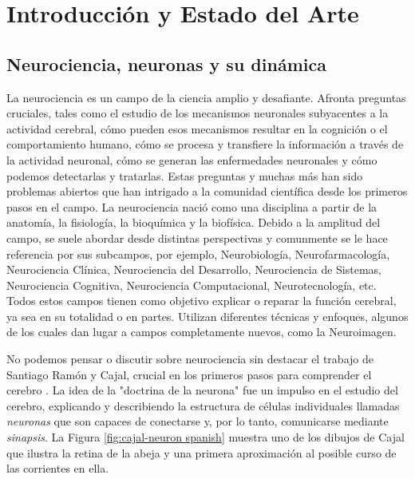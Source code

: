 \chapter{Introducción y Estado del Arte}
\label{c-intro spanish}

\section{Neurociencia, neuronas y su dinámica}
La neurociencia es un campo de la ciencia amplio y desafiante. Afronta preguntas cruciales, tales como el estudio de los mecanismos neuronales subyacentes a la actividad cerebral, cómo pueden esos mecanismos resultar en la cognición o el comportamiento humano, cómo se procesa y transfiere la información a través de la actividad neuronal, cómo se generan las enfermedades neuronales y cómo podemos detectarlas y tratarlas. 
Estas preguntas y muchas más han sido problemas abiertos que han intrigado a la comunidad científica desde los primeros pasos en el campo. La neurociencia nació como una disciplina a partir de la anatomía, la fisiología, la bioquímica y la biofísica. Debido a la amplitud del campo, se suele abordar desde distintas perspectivas y comunmente se le hace referencia por sus subcampos, por ejemplo, Neurobiología, Neurofarmacología, Neurociencia Clínica, Neurociencia del Desarrollo, Neurociencia de Sistemas, Neurociencia Cognitiva, Neurociencia Computacional, Neurotecnología, etc. Todos estos campos tienen como objetivo explicar o reparar la función cerebral, ya sea en su totalidad o en partes. Utilizan diferentes técnicas y enfoques, algunos de los cuales dan lugar a campos completamente nuevos, como la Neuroimagen.

No podemos pensar o discutir sobre neurociencia sin destacar el trabajo de Santiago Ramón y Cajal, crucial en los primeros pasos para comprender el cerebro \parencite{ramon_y_cajal_textura_1899,de_carlos_historical_2007,de_castro_editorial_2016,delgado-garcia_cajal_2015,de_castro_cajal_2019}. La idea de la "doctrina de la neurona" fue un impulso en el estudio del cerebro, explicando y describiendo la estructura de células individuales llamadas \textit{neuronas} que son capaces de conectarse y, por lo tanto, comunicarse mediante \textit{sinapsis}. La Figura \ref{fig:cajal-neuron spanish} muestra uno de los dibujos de Cajal que ilustra la retina de la abeja y una primera aproximación al posible curso de las corrientes en ella.

